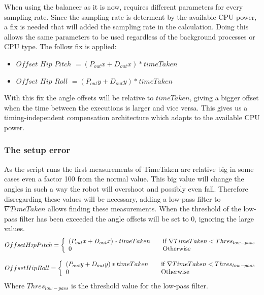 \documentclass[a4paper]{article}
\begin{document}
When using the balancer as it is now, requires different parameters for every sampling rate.
Since the sampling rate is determent by the available CPU power, a fix is needed that will added the sampling rate in the calculation.
Doing this allows the same parameters to be used regardless of the background processes or CPU type.
The follow fix is applied:
\begin{itemize}
	\item $Offset$ $Hip$ $Pitch$ $= (P_{out}x + D_{out}x) * timeTaken $ 
	\item $Offset$ $Hip$ $Roll$ $=  (P_{out}y + D_{out}y) * timeTaken$ 
\end{itemize}
With this fix the angle offsets will be relative to $timeTaken$, giving a bigger offset when the time between the executions is larger and vice versa. This gives us a timing-independent compensation architecture which adapts to the available CPU power.

\subsubsection{The setup error}

As the script runs the first measurements of TimeTaken are relative big in some cases even a factor 100 from the normal value.
This big value will change the angles in such a way the robot will overshoot and possibly even fall.
Therefore disregarding these values will be necessary, adding a low-pass filter to $\nabla TimeTaken$ allows finding these measurements. When the threshold of the low-pass filter has been exceeded the angle offsets will be set to 0, ignoring the large values.
\[
  Offset Hip Pitch = \left\{ 
  \begin{array}{l l}
     (P_{out}x + D_{out}x)  * timeTaken& \quad \text{if $\nabla TimeTaken < Thres_{low-pass}$}\\ 
    0 & \quad \text{Otherwise}\\
  \end{array} \right.
\]

\[
  Offset Hip Roll = \left\{ 
  \begin{array}{l l}
     (P_{out}y + D_{out}y)  * timeTaken& \quad \text{if $\nabla TimeTaken < Thres_{low-pass}$}\\ 
    0 & \quad \text{Otherwise}\\
  \end{array} \right.
\]
Where $Thres_{low-pass}$ is the threshold value for the low-pass filter.
\end{document}
